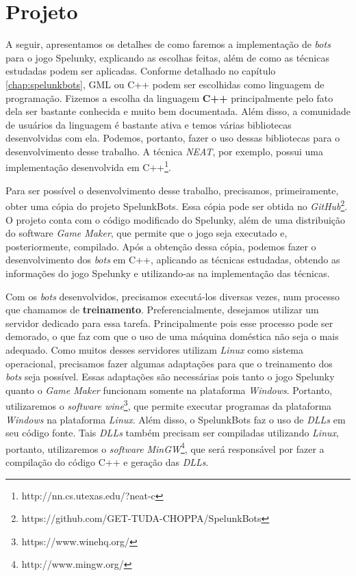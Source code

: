 \chapter{\label{chap:project}Projeto}

A seguir, apresentamos os detalhes de como faremos a implementação de
\textit{bots} para o jogo Spelunky, explicando as escolhas feitas, além de como
as técnicas estudadas podem ser aplicadas. Conforme detalhado no capítulo
\ref{chap:spelunkbots}, GML ou C++ podem ser escolhidas como linguagem de
programação. Fizemos a escolha da linguagem \textbf{C++} principalmente pelo
fato dela ser bastante conhecida e muito bem documentada. Além disso, a
comunidade de usuários da linguagem é bastante ativa e temos várias bibliotecas
desenvolvidas com ela. Podemos, portanto, fazer o uso dessas bibliotecas para o
desenvolvimento desse trabalho. A técnica \textit{NEAT}, por exemplo, possui uma
implementação desenvolvida em C++\footnote{http://nn.cs.utexas.edu/?neat-c}.

Para ser possível o desenvolvimento desse trabalho, precisamos, primeiramente,
obter uma cópia do projeto SpelunkBots. Essa cópia pode ser obtida no
\textit{GitHub}\footnote{https://github.com/GET-TUDA-CHOPPA/SpelunkBots}. O
projeto conta com o código modificado do Spelunky, além de uma distribuição do
software \textit{Game Maker}, que permite que o jogo seja executado e,
posteriormente, compilado. Após a obtenção dessa cópia, podemos fazer o
desenvolvimento dos \textit{bots} em C++, aplicando as técnicas estudadas,
obtendo as informações do jogo Spelunky e utilizando-as na implementação das
técnicas.

Com os \textit{bots} desenvolvidos, precisamos executá-los diversas vezes, num
processo que chamamos de \textbf{treinamento}.  Preferencialmente, desejamos
utilizar um servidor dedicado para essa tarefa.  Principalmente pois esse
processo pode ser demorado, o que faz com que o uso de uma máquina doméstica
não seja o mais adequado. Como muitos desses servidores utilizam \textit{Linux}
como sistema operacional, precisamos fazer algumas adaptações para que o
treinamento dos \textit{bots} seja possível. Essas adaptações são necessárias
pois tanto o jogo Spelunky quanto o \textit{Game Maker} funcionam somente na
plataforma \textit{Windows}.  Portanto, utilizaremos o \textit{software}
\textit{wine}\footnote{https://www.winehq.org/}, que permite executar programas
da plataforma \textit{Windows} na plataforma \textit{Linux}.  Além disso, o
SpelunkBots faz o uso de \textit{DLLs} em seu código fonte. Tais \textit{DLLs}
também precisam ser compiladas utilizando \textit{Linux}, portanto,
utilizaremos o \textit{software}
\textit{MinGW}\footnote{http://www.mingw.org/}, que será responsável por fazer
a compilação do código C++ e geração das \textit{DLLs}.

